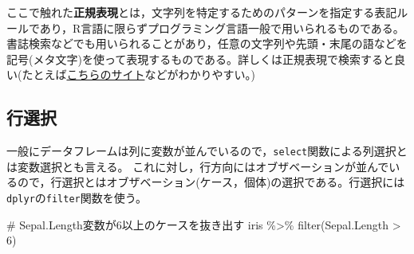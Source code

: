 \documentclass[
  a4paper,
]{ltjsbook}
\newenvironment{Shaded}{\begin{snugshade}}{\end{snugshade}}
\newcommand{\CommentTok}[1]{\textcolor[rgb]{0.37,0.37,0.37}{#1}}
\newcommand{\DecValTok}[1]{\textcolor[rgb]{0.68,0.00,0.00}{#1}}
\newcommand{\FunctionTok}[1]{\textcolor[rgb]{0.28,0.35,0.67}{#1}}
\newcommand{\NormalTok}[1]{\textcolor[rgb]{0.00,0.23,0.31}{#1}}
\newcommand{\SpecialCharTok}[1]{\textcolor[rgb]{0.37,0.37,0.37}{#1}}
\begin{document}
ここで触れた\textbf{正規表現}とは，文字列を特定するためのパターンを指定する表記ルールであり，R言語に限らずプログラミング言語一般で用いられるものである。書誌検索などでも用いられることがあり，任意の文字列や先頭・末尾の語などを記号(メタ文字)を使って表現するものである。詳しくは正規表現で検索すると良い(たとえば\href{https://userweb.mnet.ne.jp/nakama/}{こちらのサイト}などがわかりやすい。)

\subsection{行選択}\label{ux884cux9078ux629e}

一般にデータフレームは列に変数が並んでいるので，\texttt{select}関数による列選択とは変数選択とも言える。
これに対し，行方向にはオブザベーションが並んでいるので，行選択とはオブザベーション(ケース，個体)の選択である。行選択には\texttt{dplyr}の\texttt{filter}関数を使う。

\begin{Shaded}
\begin{Highlighting}[]
\CommentTok{\# Sepal.Length変数が6以上のケースを抜き出す}
\NormalTok{iris }\SpecialCharTok{\%\textgreater{}\%} \FunctionTok{filter}\NormalTok{(Sepal.Length }\SpecialCharTok{\textgreater{}} \DecValTok{6}\NormalTok{)}
\end{Highlighting}
\end{Shaded}
\end{document}
